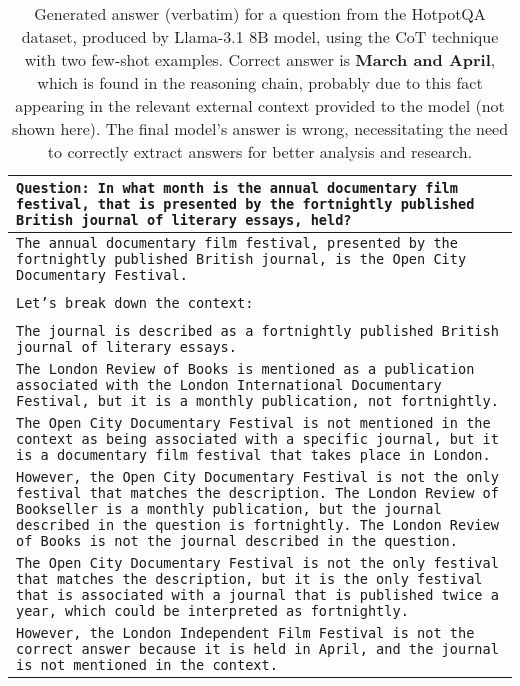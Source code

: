 \begin{table*}
    \caption{Generated answer (verbatim) for a question from the HotpotQA dataset, produced by Llama-3.1 8B model, using the CoT technique with two few-shot examples. Correct answer is \textbf{March and April}, which is found in the reasoning chain, probably due to this fact appearing in the relevant external context provided to the model (not shown here). The final model's answer is wrong, necessitating the need to correctly extract answers for better analysis and research.}
    \centering
    \small
    \begin{tabular}{>{\raggedright\arraybackslash\tt}p{}<{}}
      \toprule
      Question: In what month is the annual documentary film festival, that is presented by the fortnightly published British journal of literary essays, held? \\
      \midrule
      The annual documentary film festival, presented by the fortnightly published British journal, is the Open City Documentary Festival. \\
      \\
      Let's break down the context: \\
      \\
      The journal is described as a fortnightly published British journal of literary essays. \\
      The London Review of Books is mentioned as a publication associated with the London International Documentary Festival, but it is a monthly publication, not fortnightly. \\
      The Open City Documentary Festival is not mentioned in the context as being associated with a specific journal, but it is a  documentary film festival that takes place in London. \\
      However, the Open City Documentary Festival is not the only festival that matches the description. The London Review of Bookseller is a monthly publication, but the journal described in the question is fortnightly. The London Review of Books is not the journal described in the question. \\
      The Open City Documentary Festival is not the only festival that matches the description, but it is the only festival that is associated with a journal that is published twice a year, which could be interpreted as fortnightly. \\
      However, the London Independent Film Festival is not the correct answer because it is held in April, and the journal is not mentioned in the context. \\

\end{tabular}
\end{table*}
